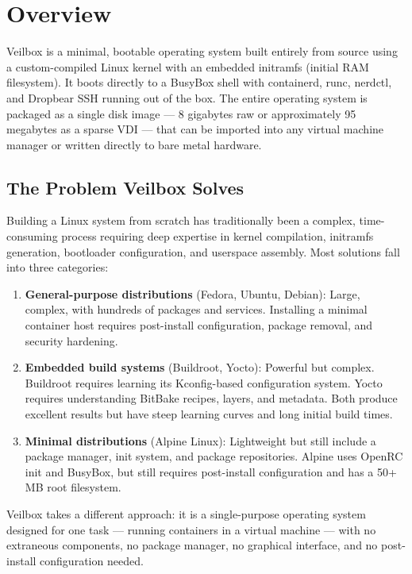 \chapter{Overview}
\label{ch:overview}

Veilbox is a minimal, bootable operating system built entirely from source
using a custom-compiled Linux kernel with an embedded initramfs (initial RAM
filesystem). It boots directly to a BusyBox shell with containerd, runc,
nerdctl, and Dropbear SSH running out of the box. The entire operating system
is packaged as a single disk image --- 8 gigabytes raw or approximately 95
megabytes as a sparse VDI --- that can be imported into any virtual machine
manager or written directly to bare metal hardware.

\section{The Problem Veilbox Solves}

Building a Linux system from scratch has traditionally been a complex,
time-consuming process requiring deep expertise in kernel compilation,
initramfs generation, bootloader configuration, and userspace assembly.
Most solutions fall into three categories:

\begin{enumerate}[nosep]
  \item \textbf{General-purpose distributions} (Fedora, Ubuntu, Debian):
        Large, complex, with hundreds of packages and services. Installing
        a minimal container host requires post-install configuration, package
        removal, and security hardening.
  \item \textbf{Embedded build systems} (Buildroot, Yocto): Powerful but
        complex. Buildroot requires learning its Kconfig-based configuration
        system. Yocto requires understanding BitBake recipes, layers, and
        metadata. Both produce excellent results but have steep learning
        curves and long initial build times.
  \item \textbf{Minimal distributions} (Alpine Linux): Lightweight but still
        include a package manager, init system, and package repositories.
        Alpine uses OpenRC init and BusyBox, but still requires post-install
        configuration and has a 50+ MB root filesystem.
\end{enumerate}

Veilbox takes a different approach: it is a single-purpose operating system
designed for one task --- running containers in a virtual machine --- with no
extraneous components, no package manager, no graphical interface, and no
post-install configuration needed.

